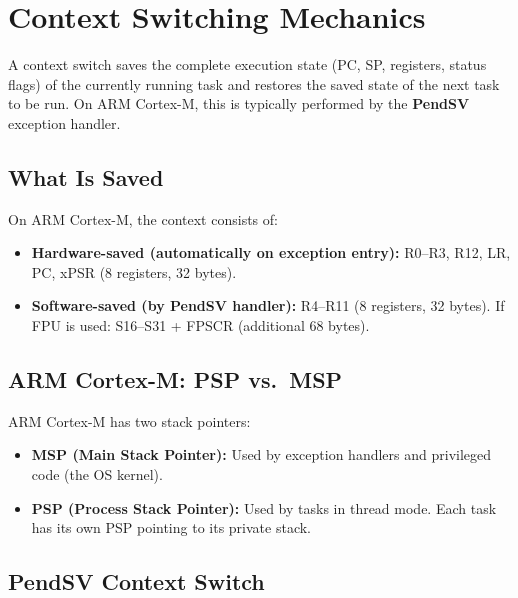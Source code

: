\section{Context Switching Mechanics}
\label{sec:mt:context}

\begin{definition}
A context switch saves the complete execution state (PC, SP, registers, status flags) of the currently running task and restores the saved state of the next task to be run. On ARM Cortex-M, this is typically performed by the \textbf{PendSV} exception handler.
\end{definition}

\subsection{What Is Saved}

On ARM Cortex-M, the context consists of:
\begin{itemize}[nosep]
  \item \textbf{Hardware-saved (automatically on exception entry):} R0--R3, R12, LR, PC, xPSR (8 registers, 32 bytes).
  \item \textbf{Software-saved (by PendSV handler):} R4--R11 (8 registers, 32 bytes). If FPU is used: S16--S31 + FPSCR (additional 68 bytes).
\end{itemize}

\subsection{ARM Cortex-M: PSP vs.\ MSP}

ARM Cortex-M has two stack pointers:
\begin{itemize}
  \item \textbf{MSP (Main Stack Pointer):} Used by exception handlers and privileged code (the OS kernel).
  \item \textbf{PSP (Process Stack Pointer):} Used by tasks in thread mode. Each task has its own PSP pointing to its private stack.
\end{itemize}

\subsection{PendSV Context Switch}

